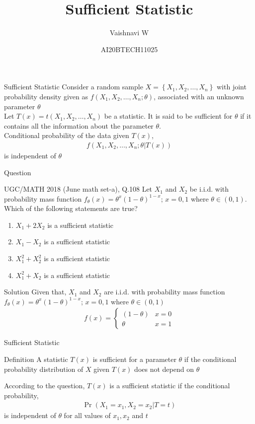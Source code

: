 \documentclass{beamer}
\title{Sufficient Statistic}
\author{Vaishnavi W}
\institute{IITH AI}
\date{AI20BTECH11025}
\providecommand{\brak}[1]{\ensuremath{\left(#1\right)}}
\providecommand{\cbrak}[1]{\ensuremath{\left\{#1\right\}}}
\begin{document}
\begin{frame}
\titlepage
\end{frame}
\begin{frame}{Sufficient Statistic}
Consider a random sample $X=\cbrak{X_1 , X_2 , \ldots , X_n}$
with joint probability density given as $f\brak{X_1,X_2,\ldots,X_n;\theta}$, associated with an unknown parameter $\theta$\\
Let $T\brak{x}=t\brak{X_1 , X_2 , \ldots , X_n}$ be a statistic. It is said to be sufficient for $\theta$ if it contains all the information about the parameter $\theta$.\\
Conditional probability of the data given $T\brak{x}$,
\begin{align}
    f\brak{X_1,X_2,\ldots,X_n;\theta|T\brak{x}}
\end{align}
is independent of $\theta$
\end{frame}
\begin{frame}{Question}
\begin{block}{UGC/MATH 2018 (June math set-a), Q.108}
Let $X_1$ and $X_2$ be i.i.d. with probability mass function $f_{\theta}\brak{x} = \theta^x \brak{1-\theta}^{1-x}$; $x=0,1$ where $\theta \in \brak{0,1}$. Which of the following statements are true?
\begin{enumerate}
    \item $X_1 + 2X_2 $ is a sufficient statistic
    \item $X_1 - X_2 $ is a sufficient statistic
    \item $X_1^2 + X_2^2 $ is a sufficient statistic
    \item $X_1^2 + X_2 $ is a sufficient statistic
\end{enumerate}
\end{block}
\end{frame}
\begin{frame}{Solution}
Given that, $X_1$ and $X_2$ are i.i.d. with probability mass function $f_{\theta}\brak{x} = \theta^x \brak{1-\theta}^{1-x}$; $x=0,1$ where $\theta \in \brak{0,1}$
\begin{align}
    f\brak{x} = 
    \begin{cases}
    \brak{1-\theta} & x=0\\
    \theta & x=1
    \end{cases}
\end{align}
\end{frame}
\begin{frame}{Sufficient Statistic}
\begin{block}{Definition}
A statistic $T\brak{x}$ is sufficient for a parameter $\theta$ if the conditional probability distribution of $X$ given $T\brak{x}$ does not depend on $\theta$
\end{block}
According to the question, $T\brak{x}$ is a sufficient statistic if the conditional probability,
\begin{align}
    \Pr{\brak{X_1=x_1,X_2=x_2|T=t}}
\end{align}
is independent of $\theta$ for all values of $x_1,x_2$ and $t$
\end{frame}
\end{document}
